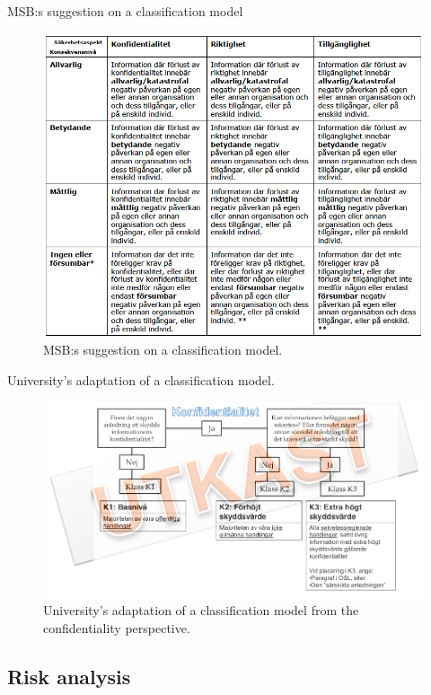 \documentclass{beamer}
\begin{document}
\begin{frame}{MSB:s suggestion on a classification model}
  \begin{figure}
    \includegraphics[height=0.7\textheight]{msb-klassificering.png}
    \caption{MSB:s suggestion on a classification model.}
  \end{figure}
\end{frame}

\begin{frame}{University's adaptation of a classification model.}
  \begin{figure}
    \includegraphics[width=\textwidth]{miun-klassificering.png}
    \caption{University's adaptation of a classification model from the
      confidentiality perspective.}
  \end{figure}
\end{frame}

\subsection{Risk analysis}
\end{document}
